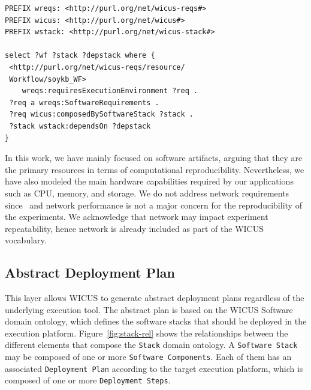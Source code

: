 \begin{lstlisting}[caption={WICUS SPARQL query example.}, label={lst:wicus-query}, basicstyle=\scriptsize]
PREFIX wreqs: <http://purl.org/net/wicus-reqs#> 
PREFIX wicus: <http://purl.org/net/wicus#> 
PREFIX wstack: <http://purl.org/net/wicus-stack#> 

select ?wf ?stack ?depstack where {
 <http://purl.org/net/wicus-reqs/resource/
 Workflow/soykb_WF> 
    wreqs:requiresExecutionEnvironment ?req .
 ?req a wreqs:SoftwareRequirements .
 ?req wicus:composedBySoftwareStack ?stack .
 ?stack wstack:dependsOn ?depstack 
}
\end{lstlisting}

In this work, we have mainly focused on software artifacts, arguing that 
they are the primary resources in terms of computational reproducibility. 
Nevertheless, we have also modeled the main hardware capabilities required 
by our applications such as CPU, memory, and storage. We do not address 
network requirements since ~and 
network performance is not a major concern for the reproducibility of the
experiments. We acknowledge that network may impact experiment repeatability,
hence network is already included as part of the WICUS vocabulary.




\subsection{Abstract Deployment Plan}

This layer allows WICUS to generate abstract deployment plans regardless of the
underlying execution tool. The abstract plan is based on the WICUS Software~\cite{wicus} 
domain ontology, which defines the software stacks that should be deployed in the 
execution platform. Figure~\ref{fig:stack-rel} shows the relationships between the different
elements that compose the \texttt{Stack} domain ontology. A \texttt{Software Stack} may
be composed of one or more \texttt{Software Components}. Each of them has an associated 
\texttt{Deployment Plan} according to the target execution platform, which is composed of 
one or more \texttt{Deployment Steps}.

